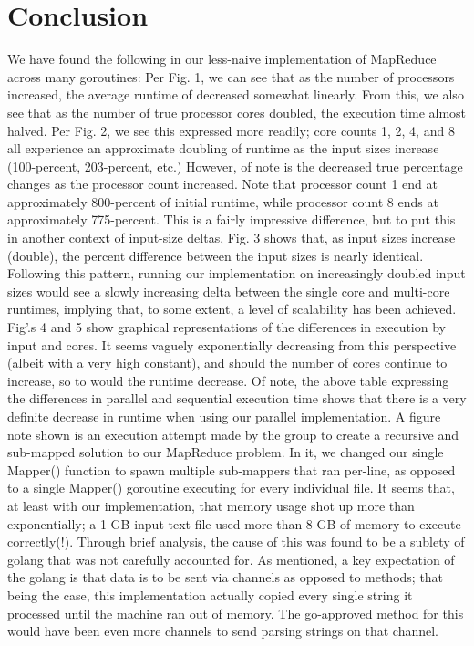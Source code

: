 \documentclass[report]{IEEEtran}
\begin{document}
\section{Conclusion}
We have found the following in our less-naive implementation of MapReduce across many goroutines: Per Fig. 1, we can see that as the number of processors increased, the average runtime of decreased somewhat linearly. From this, we also see that as the number of true processor cores doubled, the execution time almost halved.  Per Fig. 2, we see this expressed more readily; core counts 1, 2, 4, and 8 all experience an approximate doubling of runtime as the input sizes increase (100-percent, 203-percent, etc.) However, of note is the decreased true percentage changes as the processor count increased. Note that processor count 1 end at approximately 800-percent of initial runtime, while processor count 8 ends at approximately 775-percent. This is a fairly impressive difference, but to put this in another context of input-size deltas, Fig. 3 shows that, as input sizes increase (double), the percent difference between the input sizes is nearly identical. Following this pattern, running our implementation on increasingly doubled input sizes would see a slowly increasing delta between the single core and multi-core runtimes, implying that, to some extent, a level of scalability has been achieved.
Fig'.s 4 and 5 show graphical representations of the differences in execution by input and cores. It seems vaguely exponentially decreasing from this perspective (albeit with a very high constant), and should the number of cores continue to increase, so to would the runtime decrease. Of note, the above table expressing the differences in parallel and sequential execution time shows that there is a very definite decrease in runtime when using our parallel implementation.
A figure note shown is an execution attempt made by the group to create a recursive and sub-mapped solution to our MapReduce problem. In it, we changed our single Mapper() function to spawn multiple sub-mappers that ran per-line, as opposed to a single Mapper() goroutine executing for every individual file. It seems that, at least with our implementation, that memory usage shot up more than exponentially; a 1 GB input text file used more than 8 GB of memory to execute correctly(!). Through brief analysis, the cause of this was found to be a sublety of golang that was not carefully accounted for. As mentioned, a key expectation of the golang is that data is to be sent via channels as opposed to methods; that being the case, this implementation actually copied every single string it processed until the machine ran out of memory. The go-approved method for this would have been even more channels to send parsing strings on that channel.
\end{document}
